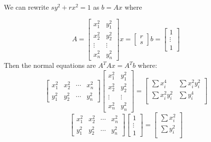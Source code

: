 \documentclass[12pt]{article}
\newenvironment{problem}[2][Problem]{\begin{trivlist}
\item[\hskip \labelsep {\bfseries #1}\hskip \labelsep {\bfseries #2}]}{\end{trivlist}}
\begin{document}
\begin{problem}{50.} 
We can rewrite $sy^2 +rx^2 = 1$ as $b = Ax$ where 

        \[
          A=
          \begin{bmatrix}
            x_1^2 & y_1^2 \\
            x_2^2 & y_2^2 \\
            \vdots & \vdots \\
            x_n^2 & y_n^2
          \end{bmatrix}
          x =
          \begin{bmatrix}
            r \\
            s
          \end{bmatrix}
          b =  \begin{bmatrix}
            1\\
            \vdots\\
            1
          \end{bmatrix}
           \]
 Then the normal equations are $A^TAx = A^Tb$ where:
 \[
          \begin{bmatrix}
            x_1^2 &  x_2^2  & \cdots & x_n^2 \\
            y_1^2 &  y_2^2  & \cdots & y_n^2
          \end{bmatrix} 
           \begin{bmatrix}
            x_1^2 & y_1^2 \\
            x_2^2 & y_2^2 \\
            \vdots & \vdots \\
            x_n^2 & y_n^2
          \end{bmatrix} = 
         \begin{bmatrix}
            \sum x_i^4 & \sum x_i^2y^2_i\\
            \sum x_i^2y^2_i &  \sum y_i^4 \\
             \end{bmatrix} 
          \]
           \[
          \begin{bmatrix}
            x_1^2 &  x_2^2  & \cdots & x_n^2 \\
            y_1^2 &  y_2^2  & \cdots & y_n^2
          \end{bmatrix} 
          \begin{bmatrix}
            1\\
            \vdots\\
            1
          \end{bmatrix} = 
         \begin{bmatrix}
            \sum x_i^2\\
           \sum y_i^2 \\
             \end{bmatrix} 
          \]

 \end{problem}
\end{document}
